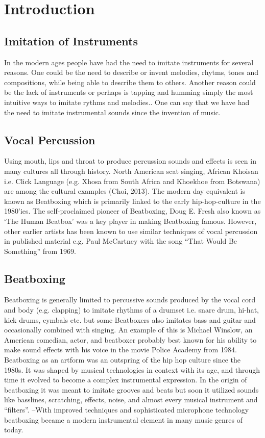 \section{ Introduction }
\subsection{ Imitation of Instruments }
In the modern ages people have had the need to imitate instruments for several reasons. One could be the need to describe or invent melodies, rhytms, tones and compositions, while being able to describe them to others. Another reason could be the lack of instruments or perhaps is tapping and humming simply the most intuitive ways to imitate rythms and melodies.\citep{Sinyor05}. One can say that we have had the need to imitate instrumental sounds since the invention of music.
\subsection{ Vocal Percussion }
Using mouth, lips and throat to produce percussion sounds and effects is seen in many cultures all through history. North American scat singing, African Khoisan i.e. Click Language (e.g. Xhosa from South Africa and Khoekhoe from Botswana) are among the cultural examples (Choi, 2013).	
The modern day equivalent is known as Beatboxing which is primarily linked to the early hip-hop-culture in the 1980’ies. The self-proclaimed pioneer of Beatboxing, Doug E. Fresh also known as ‘The Human Beatbox’ was a key player in making Beatboxing famous. However, other earlier artists has been known to use similar techniques of vocal percussion in published material e.g. Paul McCartney with the song “That Would Be Something” from 1969.
\subsection{ Beatboxing }
Beatboxing is generally limited to percussive sounds produced by the vocal cord and body (e.g. clapping) to imitate rhythms of a drumset i.e. snare drum, hi-hat, kick drums, cymbals etc. but some Beatboxers also imitates bass and guitar and occasionally combined with singing. An example of this is Michael Winslow, an American comedian, actor, and beatboxer probably best known for his ability to make sound effects with his voice in the movie Police Academy from 1984. Beatboxing as an artform was an outspring of the hip hop culture since the 1980s. It was shaped by musical technologies in context with its age, and through time it evolved to become a complex instrumental expression. In the origin of beatboxing it was meant to imitate grooves and beats but soon it utilized sounds like basslines, scratching, effects, noise, and almost every musical instrument and “filters”. –With improved techniques and sophisticated microphone technology beatboxing became a modern instrumental element in many music genres of today.
